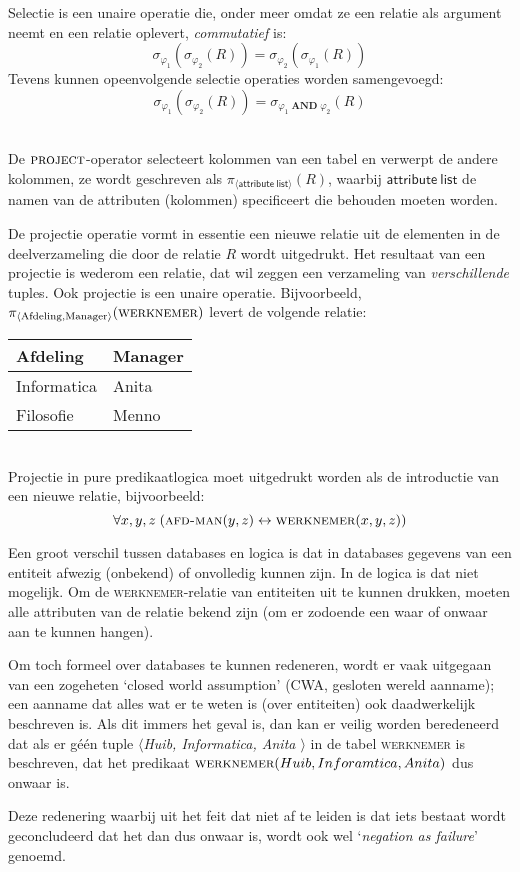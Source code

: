 Selectie is een unaire operatie die, onder meer omdat ze een relatie als argument neemt en een relatie oplevert, \textit{commutatief} is: $$\sigma_{\varphi_1}(\sigma_{\varphi_2}(R)) = \sigma_{\varphi_2}(\sigma_{\varphi_1}(R))$$ Tevens kunnen opeenvolgende selectie operaties worden samengevoegd: $$\sigma_{\varphi_1}(\sigma_{\varphi_2}(R)) = \sigma_{\varphi_1\;\mathbf{AND}\;\varphi_2}(R)$$

\begin{definition}[Projectie]\mbox{}\\
De $\mathsf{\textsc{project}}$-operator selecteert kolommen van een tabel en verwerpt de andere kolommen, ze wordt geschreven als $\pi_{\langle\mathsf{attribute\ list}\rangle}(R)$, waarbij $\mathsf{attribute\ list}$ de namen van de attributen (kolommen) specificeert die behouden moeten worden.
\end{definition}
De projectie operatie vormt in essentie een nieuwe relatie uit de elementen in de deelverzameling die door de relatie $R$ wordt uitgedrukt. Het resultaat van een projectie is wederom een relatie, dat wil zeggen een verzameling van \textit{verschillende} tuples. Ook projectie is een unaire operatie. Bijvoorbeeld, $\pi_{\langle \text{Afdeling},\text{Manager}\rangle}(\textsc{werknemer})$ levert de volgende relatie:\\[2.5pt]
\begin{tabular}{|l|l|}
\hline
Afdeling & Manager\\
\hline
Informatica & Anita\\
Filosofie & Menno\\
\hline
\end{tabular}\\[2.5pt]
Projectie in pure predikaatlogica moet uitgedrukt worden als de introductie van een nieuwe relatie, bijvoorbeeld:
$$\forall x,y,z\; (\textsc{afd-man}(y,z) \leftrightarrow\textsc{werknemer}(x,y,z))$$

\begin{aside}\mbox{}
Een groot verschil tussen databases en logica is dat in databases gegevens van een entiteit afwezig (onbekend) of onvolledig kunnen zijn. In de logica is dat niet mogelijk. Om de \textsc{werknemer}-relatie van entiteiten uit te kunnen drukken, moeten alle attributen van de relatie bekend zijn (om er zodoende een waar of onwaar aan te kunnen hangen).

Om toch formeel over databases te kunnen redeneren, wordt er vaak uitgegaan van een zogeheten `closed world assumption' (CWA, gesloten wereld aanname); een aanname dat alles wat er te weten is (over entiteiten) ook daadwerkelijk beschreven is. Als dit immers het geval is, dan kan er veilig worden beredeneerd dat als er g\'e\'en tuple \textit{$\langle$Huib, Informatica, Anita $\rangle$} in de tabel \textsc{werknemer} is beschreven, dat het predikaat $\textsc{werknemer}(Huib, Inforamtica, Anita)$ dus onwaar is. 

Deze redenering waarbij uit het feit dat niet af te leiden is dat iets bestaat wordt geconcludeerd dat het dan dus onwaar is, wordt ook wel `\textit{negation as failure}' genoemd.
\end{aside}

